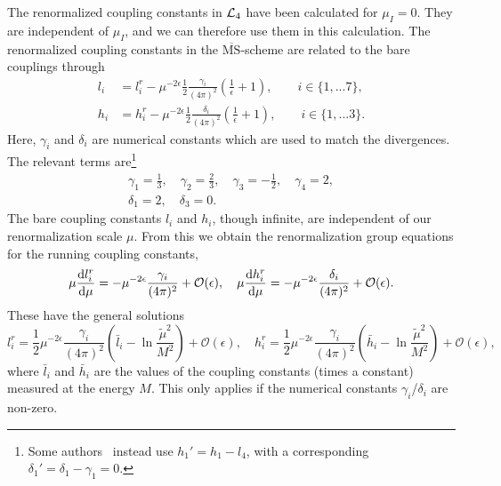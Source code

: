 The renormalized coupling constants in $\mathcal{L}_4$ have been calculated for $\mu_I = 0$\autocite{gasserChiralPerturbationTheory1984}.
They are independent of $\mu_I$, and we can therefore use them in this calculation.
The renormalized coupling constants in the $\overline{\mathrm{MS}}$-scheme are related to the bare couplings through
%
\begin{align}
    l_i 
    & = 
    l_i^r 
    - \mu^{-2\epsilon}\frac{1}{2} \frac{\gamma_i }{(4 \pi)^2} 
    \left(\frac{1}{\epsilon} + 1 \right),
    \quad \quad
    i \in \{1, ... 7\},
    \\
    h_i 
    & = 
    h_i^r
    - \mu^{-2\epsilon} \frac{1}{2}  \frac{\delta_i }{(4 \pi)^2} 
    \left(\frac{1}{\epsilon} + 1 \right), 
    \quad \quad
    i \in \{1, ... 3\}.
\end{align}
%
Here, $\gamma_i$ and $\delta_i$ are numerical constants which are used to match the divergences.
The relevant terms are\footnote{Some authors~\autocite{adhikariTwoflavorChiralPerturbation2019,gerberHadronsChiralPhase1989} instead use $h_1' = h_1 - l_4$, with a corresponding $\delta_1' = \delta_1 - \gamma_1 = 0$.}
%
\begin{gather}
    \gamma_1 = \frac{1}{3}, \quad
    \gamma_2 = \frac{2}{3}, \quad
    \gamma_3 = - \frac{1}{2}, \quad
    \gamma_4 = 2, \\
    \delta_1 = 2, \quad
    \delta_3 = 0.
\end{gather}
%
The bare coupling constants $l_i$ and $h_i$, though infinite, are independent of our renormalization scale $\mu$.
From this we obtain the renormalization group equations for the running coupling constants,
\begin{equation}
    \mu \odv{l_i^r}{\mu } = - \mu^{-2\epsilon} \frac{\gamma_i }{(4 \pi)^2} + \mathcal{O}(\epsilon), \quad
    \mu \odv{h_i^r}{\mu } = -  \mu^{-2\epsilon}\frac{\delta_i}{(4 \pi)^2}+ \mathcal{O}(\epsilon).
\end{equation}
%
These have the general solutions
\begin{equation}
    l_i^r 
    = \frac{1}{2} \mu^{-2\epsilon} \frac{\gamma_i}{(4 \pi)^2} 
    \left( \bar l_i - \ln{\frac{\tilde \mu^2}{M^2}} \right)+ \mathcal{O}(\epsilon),
    \quad
    h_i^r 
    = \frac{1}{2} \mu^{-2\epsilon} \frac{\gamma_i}{(4 \pi)^2} 
    \left( \bar h_i - \ln{\frac{\tilde \mu^2}{M^2}} \right)+ \mathcal{O}(\epsilon),
\end{equation}
%
where $\bar l_i$ and $\bar h_i$ are the values of the coupling constants (times a constant) measured at the energy $M$.
This only applies if the numerical constants $\gamma_i$/$\delta_i$ are non-zero.

